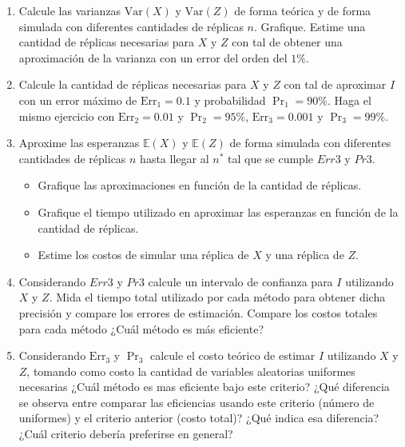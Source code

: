 \begin{enumerate}
  \item Calcule las varianzas $\mathrm{Var}(X)$ y $\mathrm{Var}(Z)$ de forma te\'{o}rica y de forma simulada con diferentes cantidades de r\'{e}plicas $n$. Grafique. Estime una cantidad de r\'{e}plicas necesarias para $X$ y $Z$ con tal de obtener una aproximaci\'{o}n de la varianza con un error del orden del $1\%$.

  \item Calcule la cantidad de r\'{e}plicas necesarias para $X$ y $Z$ con tal de aproximar $I$ con un error m\'{a}ximo de $\mathrm{Err}_{1}=0.1$ y probabilidad $\Pr_{1}=90\%$. Haga el mismo ejercicio con $\mathrm{Err}_{2}=0.01$ y $\Pr_{2}=95\%$, $\mathrm{Err}_{3}=0.001$ y $\Pr_{3}=99\%.$

  \item Aproxime las esperanzas $\mathbb{E}(X)$ y $\mathbb{E}(Z)$ de forma simulada con diferentes cantidades de réplicas $n$ hasta llegar al $n^*$ tal que se cumple $Err3$ y $Pr3$.
  \begin{itemize}
      \item Grafique las aproximaciones en función de la cantidad de réplicas.
      \item Grafique el tiempo utilizado en aproximar las esperanzas en función de la cantidad de réplicas. 
      \item Estime los costos de simular una réplica de $X$ y una réplica de $Z$.
  \end{itemize}

  \item Considerando $Err3$ y $Pr3$ calcule un intervalo de confianza para $I$ utilizando $X$ y $Z$. Mida el tiempo total utilizado por cada método para obtener dicha precisión y compare los errores de estimación. Compare los costos totales para cada método ¿Cuál método es más eficiente?

  \item Considerando $\mathrm{Err}_{3}$ y $\Pr_{3}$ calcule el costo te\'{o}rico de estimar $I$ utilizando $X$ y $Z$, tomando como costo la cantidad de variables aleatorias uniformes necesarias ¿Cuál método es mas eficiente bajo este criterio? ¿Qué diferencia se observa entre comparar las eficiencias usando este criterio (número de uniformes) y el criterio anterior (costo total)? ¿Qué indica esa diferencia? ¿Cuál criterio debería preferirse en general?
\end{enumerate}

